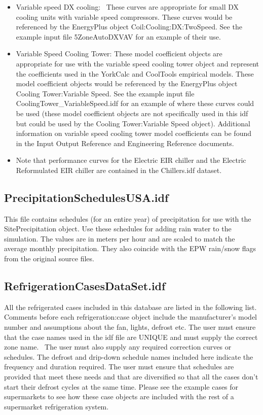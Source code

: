 \begin{itemize}
\item
  Variable speed DX cooling:~ These curves are appropriate for small DX cooling units with variable speed compressors. These curves would be referenced by the EnergyPlus object Coil:Cooling:DX:TwoSpeed. See the example input file 5ZoneAutoDXVAV for an example of their use.
\item
  Variable Speed Cooling Tower: These model coefficient objects are appropriate for use with the variable speed cooling tower object and represent the coefficients used in the YorkCalc and CoolTools empirical models. These model coefficient objects would be referenced by the EnergyPlus object Cooling Tower:Variable Speed. See the example input file CoolingTower\_VariableSpeed.idf for an example of where these curves could be used (these model coefficient objects are not specifically used in this idf but could be used by the Cooling Tower:Variable Speed object). Additional information on variable speed cooling tower model coefficients can be found in the Input Output Reference and Engineering Reference documents.
\item
  Note that performance curves for the Electric EIR chiller and the Electric Reformulated EIR chiller are contained in the Chillers.idf dataset.
\end{itemize}

\subsection{PrecipitationSchedulesUSA.idf}\label{precipitationschedulesusa.idf}

This file contains schedules (for an entire year) of precipitation for use with the SitePrecipitation object. Use these schedules for adding rain water to the simulation. The values are in meters per hour and are scaled to match the average monthly precipitation. They also coincide with the EPW rain/snow flags from the original source files.

\subsection{RefrigerationCasesDataSet.idf}\label{refrigerationcasesdataset.idf}

All the refrigerated cases included in this database are listed in the following list. Comments before each refrigeration:case object include the manufacturer's model number and assumptions about the fan, lights, defrost etc. The user must ensure that the case names used in the idf file are UNIQUE and must supply the correct zone name.~ The user must also supply any required correction curves or schedules. The defrost and drip-down schedule names included here indicate the frequency and duration required. The user must ensure that schedules are provided that meet these needs and that are diversified so that all the cases don't start their defrost cycles at the same time. Please see the example cases for supermarkets to see how these case objects are included with the rest of a supermarket refrigeration system.

